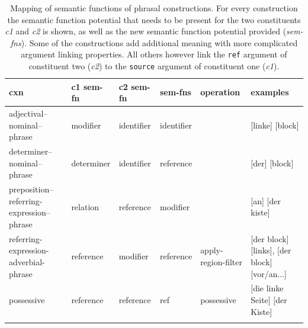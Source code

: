 \begin{table}
\begin{footnotesize}
\begin{tabularx}{\textwidth}{YYYYYY}
\lsptoprule
cxn &  c1 sem-fn & c2 sem-fn & sem-fns & operation  & examples\\
\midrule
adjectival--nominal--phrase  & modifier &identifier &identifier & &[linke] [block] 
\\ \midrule
determiner--nominal--phrase  & determiner & identifier & reference & & [der] [block] 
\\ \midrule
preposition--referring-expression--phrase & relation &reference & modifier &  & [an] [der kiste] 
\\ \midrule 
referring-expression-adverbial-phrase  & reference & modifier & reference & 
apply-region-filter & [der block] [links], [der block] [vor/an...] 
\\ \midrule 
possessive  & reference & reference & ref & possessive
& [die linke Seite] [der Kiste] 
\\\lspbottomrule
\end{tabularx}
\end{footnotesize}
\caption[Mapping of semantic functions]{Mapping of semantic functions of phrasal constructions. For every construction the semantic function 
potential that needs to be present for the two constituents \emph{c1} and \emph{c2} is shown, as well as the 
new semantic function potential provided (\emph{sem-fns}). Some of the constructions add additional meaning
with more complicated argument linking properties. All others however link the {\footnotesize\tt ref} argument of constituent two (\emph{c2}) to the {\footnotesize\tt source} argument of constituent one (\emph{c1}).}
\label{t:phrasal-sem}
\end{table}

